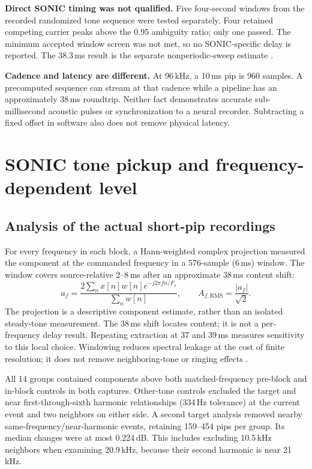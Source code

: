 \documentclass[11pt,letterpaper]{article}
\begin{document}
\textbf{Direct SONIC timing was not qualified.} Five four-second windows from the
recorded randomized tone sequence were tested separately. Four retained competing
carrier peaks above the 0.95 ambiguity ratio; only one passed. The minimum accepted
window screen was not met, so no SONIC-specific delay is reported. The
38.3\,ms result is the separate nonperiodic-sweep estimate \cite{playback}.

\textbf{Cadence and latency are different.} At 96\,kHz, a 10\,ms pip is 960 samples.
A precomputed sequence can stream at that cadence while a pipeline has an
approximately 38\,ms roundtrip. Neither fact demonstrates accurate sub-millisecond
acoustic pulses or synchronization to a neural recorder. Subtracting a fixed
offset in software also does not remove physical latency.

\newpage
\section{SONIC tone pickup and frequency-dependent level}
\subsection{Analysis of the actual short-pip recordings}
For every frequency in each block, a Hann-weighted complex projection measured
the component at the commanded frequency in a 576-sample (6\,ms) window. The
window covers source-relative 2--8\,ms after an approximate 38\,ms content shift:
\[
a_f=\frac{2\sum_n x[n]w[n]e^{-j2\pi fn/F_s}}{\sum_n w[n]},
\qquad A_{f,\mathrm{RMS}}=\frac{|a_f|}{\sqrt{2}}.
\]
The projection is a descriptive component estimate, rather than an isolated
steady-tone measurement. The 38\,ms shift locates content; it is not a
per-frequency delay result. Repeating extraction at 37 and 39\,ms measures
sensitivity to this local choice. Windowing reduces spectral leakage at the cost
of finite resolution; it does not remove neighboring-tone or ringing effects
\cite{ni,pip}.

\begin{table}[H]
\centering\small

\caption{All-target medians, 600 pips/frequency/capture. Levels are relative to the same capture's 2-kHz median. Minimum contrast is the lowest pre-block or other-tone contrast across S1/S2, in amplitude-ratio dB, not calibrated SNR. Alignment span is the larger 37--39-ms sensitivity span across the two captures.}
\end{table}

All 14 groups contained components above both matched-frequency pre-block and
in-block controls in both captures. Other-tone controls excluded the target and
near first-through-sixth harmonic relationships (334\,Hz tolerance) at the current
event and two neighbors on either side. A second target analysis removed nearby
same-frequency/near-harmonic events, retaining 159--454 pips per group. Its median
changes were at most 0.224\,dB. This includes excluding 10.5\,kHz neighbors when
examining 20.9\,kHz, because their second harmonic is near 21\,kHz.
\end{document}
